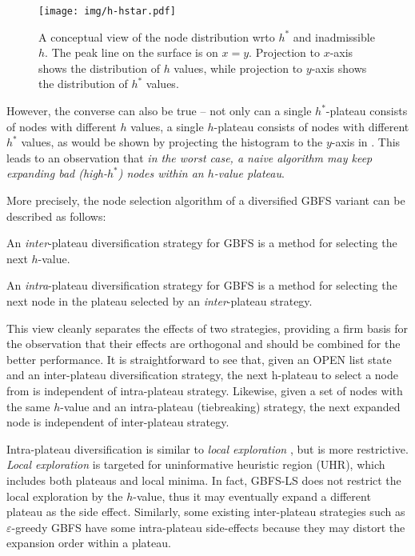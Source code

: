 \begin{figure}[bt]
 \centering
 \texttt{[image: img/h-hstar.pdf]}
 \caption{A conceptual view of the node distribution wrto $h^*$ and inadmissible $h$.
 The peak line on the surface is on $x=y$.
 Projection to $x$-axis shows the distribution of $h$ values, while 
 projection to $y$-axis shows the distribution of $h^*$ values.
 }
 \label{fig:h-hstar}
\end{figure}

However, the converse can also be true --
not only can a single $h^*$-plateau consists of nodes with different $h$ values,
a single $h$-plateau consists of nodes with different $h^*$ values,
as would be shown by projecting the histogram  to the $y$-axis in .
This leads to an observation that
\emph{in the worst case, a naive algorithm may keep expanding bad (high-$h^*$) nodes within an $h$-value plateau}.

More precisely, the node selection algorithm of a diversified GBFS variant can be described as follows:
\begin{defi}
 An \emph{inter}-plateau diversification strategy for GBFS is a method for selecting the next $h$-value.
\end{defi}
\begin{defi}
 An \emph{intra}-plateau diversification strategy for GBFS is a method for selecting the next node in the plateau selected by an \emph{inter}-plateau strategy.
\end{defi}
This view cleanly separates the effects of two strategies, providing a firm basis for the observation that their effects are orthogonal and should be combined for the better performance.
It is straightforward to see that,
given an OPEN list state and an inter-plateau diversification strategy,
the next h-plateau to select a node from is independent of intra-plateau strategy.
Likewise, given a set of nodes with the same $h$-value and an intra-plateau (tiebreaking) strategy,
the next expanded node is independent of inter-plateau strategy.

Intra-plateau diversification is similar to \emph{local exploration} \cite{XieH14gbfsle,XieMH15}, but is more restrictive. \emph{Local exploration} is targeted for uninformative heuristic region (UHR), which includes both plateaus and local minima. In fact, GBFS-LS does not restrict the local exploration by the $h$-value, thus it may eventually expand a different plateau as the side effect.
Similarly, some existing inter-plateau strategies such as $\varepsilon$-greedy GBFS have some intra-plateau side-effects because they may distort the expansion order within a plateau.

